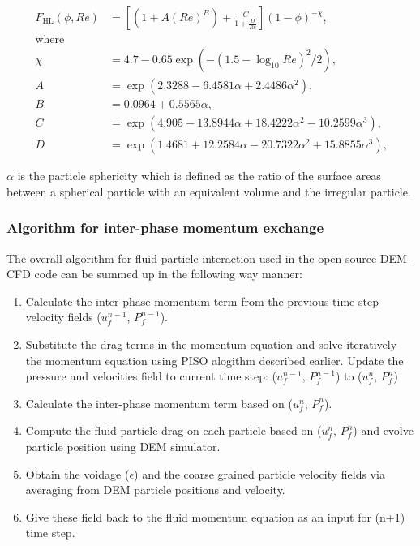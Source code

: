 \documentclass[11pt,a4paper,openright]{article}
\begin{document}
\begin{align}
\label{eq:DiFelicea}
F_{\mathrm{HL}} (\phi,Re) & = \left [ (1+A(Re)^B) + \frac{C}{1+\frac{D}{Re}} \right ] (1-\phi)^{-\chi } \text{,} \\ 
\text{where} &  \nonumber \\
\chi &= 4.7 - 0.65 \exp({-(1.5-\log_{10}Re)^2/2})\text{,} \nonumber\\ 
A &= \exp(2.3288-6.4581\alpha + 2.4486\alpha^2) \text{,}  \nonumber\\ 
B &= 0.0964 + 0.5565\alpha   \text{,}   \nonumber\\
C &= \exp(4.905 -13.8944\alpha + 18.4222\alpha^2 -10.2599\alpha^3) \text{,}  \nonumber \\
D &= \exp(1.4681+12.2584\alpha-20.7322\alpha^2 + 15.8855\alpha^3) \text{,}  \nonumber
\end{align}

$\alpha$ is the particle sphericity which is defined as the ratio of the surface areas between a spherical particle with an equivalent volume and the irregular particle. 

\subsubsection{Algorithm for inter-phase momentum exchange}
The overall algorithm for fluid-particle interaction used in the open-source DEM-CFD code can be summed up in the following way manner:

\begin{enumerate}
\item Calculate the inter-phase momentum term from the previous time step velocity fields ($u_{f}^{n-1}$, $P_{f}^{n-1}$).
\item Substitute the drag terms in the momentum equation and solve iteratively the momentum equation using PISO alogithm described earlier. Update the pressure and velocities field to current time step: ($u_{f}^{n-1}$, $P_{f}^{n-1}$) to ($u_{f}^n$, $P_{f}^n$) 
\item Calculate the inter-phase momentum term based on ($u_{f}^n$, $P_{f}^n$).
\item Compute the fluid particle drag on each particle based on ($u_{f}^n$, $P_{f}^n$) and evolve particle position using DEM simulator.
\item Obtain the voidage ($\epsilon$) and the coarse grained particle velocity fields via averaging from DEM particle positions and velocity. 
\item Give these field back to the fluid momentum equation as an input for (n+1) time step.
\end{enumerate}
\end{document}
